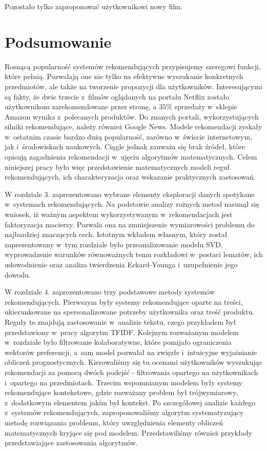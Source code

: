 \documentclass[12pt,a4paper]{report}
\begin{document}
Pozostało tylko zaproponować użytkownikowi nowy film.


\chapter{Podsumowanie}

Rosnącą popularność systemów rekomendujących przypisujemy szeregowi funkcji, które pełnią. Pozwalają one nie tylko na efektywne wyszukanie konkretnych przedmiotów, ale także na tworzenie propozycji dla użytkowników. Interesującymi są fakty, że dwie trzecie z~filmów oglądanych na portalu Netflix zostało użytkownikom zarekomendowane przez stronę, a $35 \% $ sprzedaży w~sklepie Amazon wynika z~polecanych produktów. Do znanych portali, wykorzystujących silniki rekomendujące, należy również Google News. Modele rekomendacji zyskały w~ostatnim czasie bardzo dużą popularność, zarówno w~świecie internetowym, jak i~środowiskach naukowych. Ciągle jednak zauważa się brak źródeł, które opisują zagadnienia rekomendacji w~ujęciu algorytmów matematycznych. Celem niniejszej pracy było więc przedstawienie matematycznych modeli reguł rekomendujących, ich charakteryzacja oraz wskazanie praktycznych zastosowań.

W rozdziale 3. zaprezentowano wybrane elementy eksploracji danych spotykane w~systemach rekomendujących. Na podstawie analizy rożnych metod nasunął się wniosek, iż ważnym aspektem wykorzystywanym w~rekomendacjach jest faktoryzacja macierzy. Pozwala ona na zmniejszenie wymiarowości problemu do najbardziej znaczących cech. Istotnym wkładem własnym, który został zaprezentowany w~tym rozdziale było przeanalizowanie modelu SVD, wyprowadzenie warunków równoważnych temu rozkładowi w~postaci lematów, ich udowodnienie oraz analiza twierdzenia Eckard-Younga i~uzupełnienie jego dowodu.

W rozdziale 4. zaprezentowano trzy podstawowe metody systemów rekomendujących. Pierwszym były systemy rekomendujące oparte na treści, ukierunkowane na spersonalizowane potrzeby użytkownika oraz treść produktu. Reguły te znajdują zastosowanie w~analizie tekstu, czego przykładem był przedstawiony w~pracy algorytm TFIDF. Kolejnym rozważanym modelem w~rozdziale było filtrowanie kolaboratywne, które pomijało ograniczenia wektorów preferencji, a~sam model pozwalał na zwięzłe i~intuicyjne wyjaśnianie obliczeń prognostycznych. Kierowaliśmy się tu ocenami użytkowników wyszukując rekomendacji za pomocą dwóch podejść - filtrowania opartego na użytkownikach i~opartego na przedmiotach. Trzecim wspomnianym modelem były systemy rekomendujące kontekstowe, gdzie rozważany problem był trójwymiarowy, z~dodatkowym elementem jakim był kontekst. Po szczegółowej analizie każdego z~systemów rekomendujących, zaproponowaliśmy algorytm systematyzujący metodę rozwiązania problemu, który uwzględnienia elementy obliczeń matematycznych kryjące się pod modelem. Przedstawiliśmy również przykłady przedstawiające zastosowania algorytmów.
\end{document}
